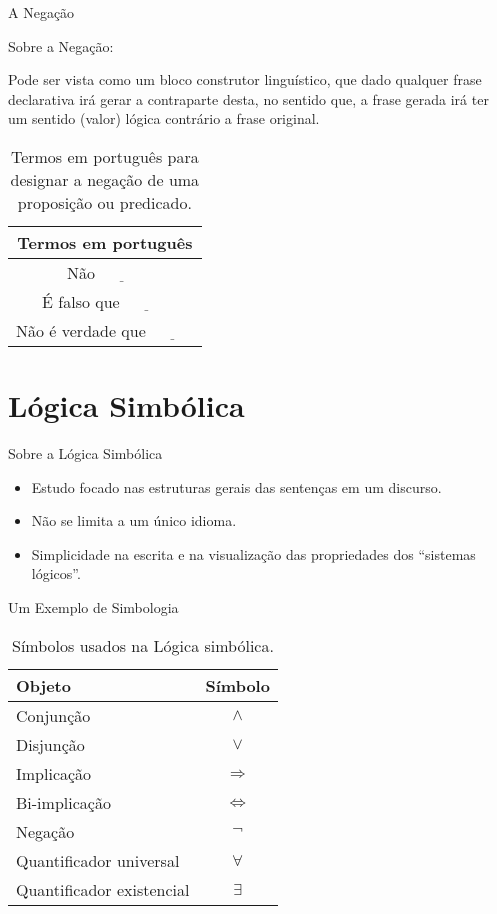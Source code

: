 \documentclass[aspectratio=169]{beamer}
\begin{document}
	\begin{frame}{A Negação}
		\begin{block}{Sobre a Negação:}
			\
			
			Pode ser vista como um bloco construtor linguístico, que dado qualquer frase declarativa irá gerar a contraparte desta, no sentido que, a frase gerada irá ter um sentido (valor) lógica contrário a frase original.
		\end{block}
		\pause
		\begin{table}[h]
			\centering
			\begin{tabular}{c}
				\hline
				\textbf{Termos em português}\\
				\hline
				Não $\underline{ \ \ \ \ \ \ \ \ \ \ \ \ }$ \\
				É falso que $\underline{ \ \ \ \ \ \ \ \ \ \ \ \ }$\\
				Não é verdade que $\underline{ \ \ \ \ \ \ \ \ \ \ \ \ }$ \\ \hline
			\end{tabular}
			\caption{Termos em português para designar a negação de uma proposição ou predicado.}
			\label{tab:NegacaoPortugues}
		\end{table}
	\end{frame}
	
	\section{Lógica Simbólica}
	
	\begin{frame}{Sobre a Lógica Simbólica}
		\begin{itemize}
			\item Estudo focado nas estruturas gerais das sentenças em um discurso.
			\item Não se limita a um único idioma.
			\item Simplicidade na escrita e na visualização das propriedades dos ``sistemas lógicos''.
		\end{itemize}
	\end{frame}
	
	\begin{frame}{Um Exemplo de Simbologia}
		\begin{table}[h]
			\centering
			\begin{tabular}{lc}
				\hline
				\textbf{Objeto} & \textbf{Símbolo}\\
				\hline
				Conjunção & $\land$\\
				Disjunção & $\lor$\\
				Implicação & $\Rightarrow$\\
				Bi-implicação & $\Leftrightarrow$\\
				Negação & $\neg$\\
				Quantificador universal & $\forall$\\
				Quantificador existencial & $\exists$\\
				\hline
			\end{tabular}
			\caption{Símbolos usados na Lógica simbólica.}
			\label{tab:SimbolosLogicos}
		\end{table}
	\end{frame}
\end{document}
